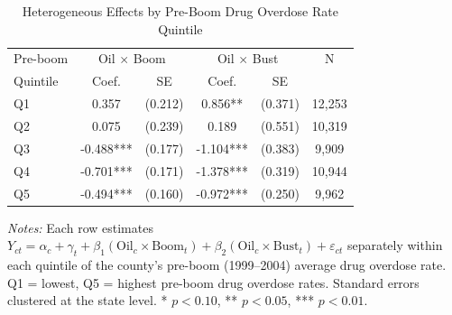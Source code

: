 \begin{table}[H]
\centering
\caption{Heterogeneous Effects by Pre-Boom Drug Overdose Rate Quintile}
\begin{threeparttable}
\begin{tabular}{lccccc}
\toprule
Pre-boom & \multicolumn{2}{c}{Oil $\times$ Boom} & \multicolumn{2}{c}{Oil $\times$ Bust} & N \\
Quintile & Coef. & SE & Coef. & SE & \\
\midrule
Q1 & 0.357 & (0.212) & 0.856** & (0.371) & 12,253 \\
Q2 & 0.075 & (0.239) & 0.189 & (0.551) & 10,319 \\
Q3 & -0.488*** & (0.177) & -1.104*** & (0.383) & 9,909 \\
Q4 & -0.701*** & (0.171) & -1.378*** & (0.319) & 10,944 \\
Q5 & -0.494*** & (0.160) & -0.972*** & (0.250) & 9,962 \\
\bottomrule
\end{tabular}
\begin{tablenotes}[flushleft]
\small
\item \textit{Notes:} Each row estimates $Y_{ct} = \alpha_c + \gamma_t + \beta_1 (\text{Oil}_c \times \text{Boom}_t) + \beta_2 (\text{Oil}_c \times \text{Bust}_t) + \varepsilon_{ct}$ separately within each quintile of the county's pre-boom (1999--2004) average drug overdose rate. Q1 = lowest, Q5 = highest pre-boom drug overdose rates. Standard errors clustered at the state level. * $p<0.10$, ** $p<0.05$, *** $p<0.01$.
\end{tablenotes}
\end{threeparttable}
\label{tab:quintile}
\end{table}
